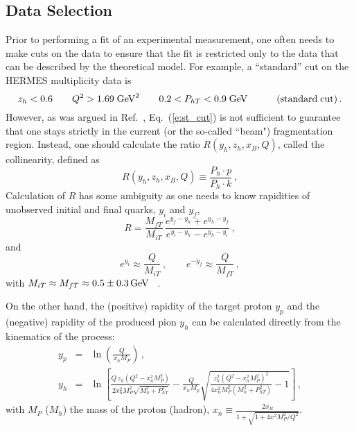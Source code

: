 \documentclass[final,3p,times,onecolumn,sort&compress,hidelinks]{elsarticle}
\newcommand\3[1]{\boldsymbol{#1}}
\begin{document}
\subsection{Data Selection}
\label{s:data}
Prior to performing a fit of an experimental measurement, one often needs to make cuts on the data to ensure that the fit is restricted only to the data that can be described by the theoretical model.  For example, a ``standard'' cut on the HERMES multiplicity data is~\cite{Anselmino:2013lza}
\begin{equation}
z_h < 0.6 \quad\quad Q^2 > 1.69 \; \textrm{GeV}^2  
\quad\quad 0.2 < P_{hT} < 0.9 \; \textrm{GeV} \quad\quad\quad{\rm (standard\;cut)}\,.\label{e:st_cut}
\end{equation}
However, as was argued in Ref.~\cite{Boglione:2016bph}, Eq.~(\ref{e:st_cut}) is not sufficient to guarantee that one stays strictly in the current (or the so-called ``beam") fragmentation region.  Instead, one should calculate the ratio $R(y_h,z_h,x_B,Q)$, called the collinearity, defined as~\cite{Boglione:2016bph}
\begin{equation}
R(y_h,z_h,x_B,Q)\equiv \frac{P_h\cdot p} {P_h\cdot k}\,,
\end{equation}
Calculation of $R$ has some ambiguity as one needs to know rapidities of unobserved initial and final quarks, $y_i$ and $y_f$,  
\begin{equation}
R = \frac{M_{fT}} {M_{iT}}\,\frac{e^{y_f-y_h}+e^{y_h-y_f}} {e^{y_i-y_h}-e^{y_h-y_i}}\,,
\end{equation}
and 
\begin{equation}
e^{y_i} \approx \frac{Q} {M_{iT}}\,,\quad\quad e^{-y_f} \approx \frac{Q} {M_{fT}}\,,
\end{equation}
with  $M_{iT} \approx M_{fT} \approx 0.5 \pm 0.3\,{\rm GeV}$ ~\cite{Boglione:2016bph}.

On the other hand, the (positive) rapidity of the target proton $y_p$ and the (negative) rapidity of the produced pion $y_h$ can be calculated directly from the kinematics of the process:
\begin{eqnarray}
y_p &=& \ln \left( \frac{Q}{x_n M_P}\right) \,,\\
y_h &=& \ln\left[\frac{Q\,z_h(Q^2-x_n^2M_P^2)} {2x_n^2M_P^2\sqrt{M_h^2+P_{hT}^2}} -\frac{Q} {x_nM_p}\sqrt{\frac{z_h^2(Q^2-x_n^2M_P^2)^2} {4x_n^2M_P^2(M_h^2+P_{hT}^2)}-1}\right]\,,
\end{eqnarray}
with $M_P$ ($M_h$) the mass of the proton (hadron), $x_n\equiv \frac{2x_B} {1+\sqrt{1+4x^2M_P^2/Q^2}}$.
\end{document}
